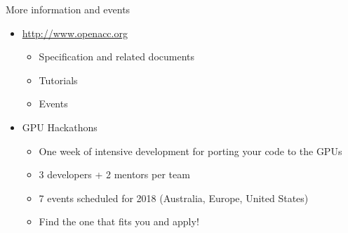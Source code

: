 \documentclass[12pt,aspectratio=169]{beamer}
\begin{document}
\begin{frame}{More information and events}
  \begin{itemize}
  \item \url{http://www.openacc.org}
    \begin{itemize}
    \item Specification and related documents
    \item Tutorials
    \item Events
    \end{itemize}
    \vfill
  \item GPU Hackathons
    \begin{itemize}
    \item One week of intensive development for porting your code to the GPUs
    \item 3 developers + 2 mentors per team
    \item 7 events scheduled for 2018 (Australia, Europe, United States)
    \item Find the one that fits you and apply!
    \end{itemize}
  \end{itemize}
\end{frame}

\end{document}

